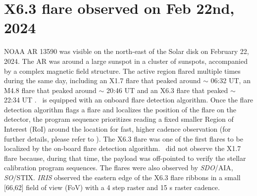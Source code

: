 \begin{table}[ht!]
\centering
\caption{Details of the flares studied in this chapter.}
\label{f_list}
\end{table}

\section{X6.3 flare observed on Feb 22nd, 2024} \label{sec:feb_22nd}

NOAA AR 13590 was visible on the north-east of the Solar disk on February 22, 2024. The AR was around a large sunspot in a cluster of sunspots, accompanied by a complex magnetic field structure. The active region flared multiple times during the same day, including an X1.7 flare that peaked around $\sim$ 06:32 UT, an M4.8 flare that peaked around $\sim$ 20:46 UT and an X6.3 flare that peaked $\sim$ 22:34 UT . \suit~is equipped with an onboard flare detection algorithm. Once the flare detection algorithm flags a flare and localizes the position of the flare on the detector, the program sequence prioritizes reading a fixed smaller Region of Interest (RoI) around the location for fast, higher cadence observation (for further details, please refer to \cite{flare_det}). The X6.3 flare was one of the first flares to be localized by the on-board flare detection algorithm. \suit~did not observe the X1.7 flare because, during that time, the payload was off-pointed to verify the stellar calibration program sequences. The flares were also observed by {\it SDO}/AIA, {\it SO}/STIX. {\it IRIS} observed the eastern edge of the X6.3 flare ribbons in a small [66\arcsec,62\arcsec] field of view (FoV) with a 4 step raster and 15 s raster cadence.

